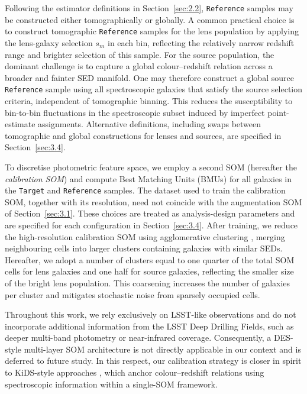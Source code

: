 Following the estimator definitions in Section~\ref{sec:2.2}, \texttt{Reference} samples may be constructed either tomographically or globally. A common practical choice is to construct tomographic \texttt{Reference} samples for the lens population by applying the lens-galaxy selection \(s_m\) in each bin, reflecting the relatively narrow redshift range and brighter selection of this sample. For the source population, the dominant challenge is to capture a global colour--redshift relation across a broader and fainter SED manifold. One may therefore construct a global source \texttt{Reference} sample using all spectroscopic galaxies that satisfy the source selection criteria, independent of tomographic binning. This reduces the susceptibility to bin-to-bin fluctuations in the spectroscopic subset induced by imperfect point-estimate assignments. Alternative definitions, including swaps between tomographic and global constructions for lenses and sources, are specified in Section~\ref{sec:3.4}.

To discretise photometric feature space, we employ a second SOM (hereafter the \textit{calibration SOM}) and compute Best Matching Units (BMUs) for all galaxies in the \texttt{Target} and \texttt{Reference} samples. The dataset used to train the calibration SOM, together with its resolution, need not coincide with the augmentation SOM of Section~\ref{sec:3.1}. These choices are treated as analysis-design parameters and are specified for each configuration in Section~\ref{sec:3.4}. After training, we reduce the high-resolution calibration SOM using agglomerative clustering \citep{2011arXiv1109.2378M}, merging neighbouring cells into larger clusters containing galaxies with similar SEDs. Hereafter, we adopt a number of clusters equal to one quarter of the total SOM cells for lens galaxies and one half for source galaxies, reflecting the smaller size of the bright lens population. This coarsening increases the number of galaxies per cluster and mitigates stochastic noise from sparsely occupied cells.

Throughout this work, we rely exclusively on LSST-like observations and do not incorporate additional information from the LSST Deep Drilling Fields, such as deeper multi-band photometry or near-infrared coverage. Consequently, a DES-style multi-layer SOM architecture \citep[e.g.][]{2019MNRAS.489..820B, 2021MNRAS.505.4249M, 2024arXiv240800922C, 2025arXiv250907964G, 2025arXiv251023566Y} is not directly applicable in our context and is deferred to future study. In this respect, our calibration strategy is closer in spirit to KiDS-style approaches \citep[e.g.][]{2020A&A...637A.100W, 2025arXiv250319440W}, which anchor colour--redshift relations using spectroscopic information within a single-SOM framework.

